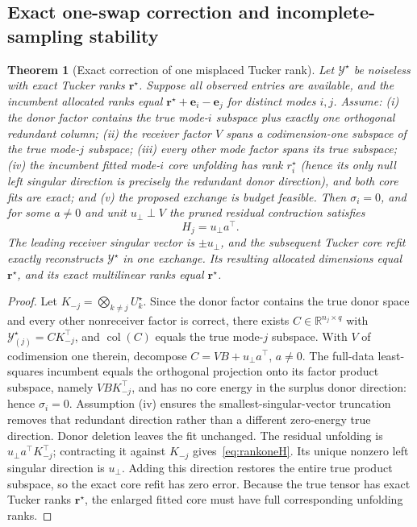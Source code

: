 \documentclass[review,10pt]{elsarticle}
\newtheorem{theorem}{Theorem}
\newcommand{\cY}{\mathcal Y}
\newcommand{\R}{\mathbb R}
\begin{document}
\subsection{Exact one-swap correction and incomplete-sampling stability}\label{subsec:oneswap}
\begin{theorem}[Exact correction of one misplaced Tucker rank]\label{thm:exactrecovery}
Let $\cY^\star$ be noiseless with exact Tucker ranks $\boldsymbol r^\star$. Suppose all observed entries are available, and the incumbent allocated ranks equal $\boldsymbol r^\star+\boldsymbol e_i-\boldsymbol e_j$ for distinct modes $i,j$. Assume: (i) the donor factor contains the true mode-$i$ subspace plus exactly one orthogonal redundant column; (ii) the receiver factor $V$ spans a codimension-one subspace of the true mode-$j$ subspace; (iii) every other mode factor spans its true subspace; (iv) the incumbent fitted mode-$i$ core unfolding has rank $r_i^\star$ (hence its only null left singular direction is precisely the redundant donor direction), and both core fits are exact; and (v) the proposed exchange is budget feasible. Then $\sigma_i=0$, and for some $a\ne0$ and unit $u_\perp\perp V$ the pruned residual contraction satisfies
\begin{equation}\label{eq:rankoneH}
H_j=u_\perp a^\top.
\end{equation}
The leading receiver singular vector is $\pm u_\perp$, and the subsequent Tucker core refit exactly reconstructs $\cY^\star$ in one exchange. Its resulting allocated dimensions equal $\boldsymbol r^\star$, and its exact multilinear ranks equal $\boldsymbol r^\star$.
\end{theorem}
\begin{proof}
Let $K_{-j}=\bigotimes_{k\ne j}U_k^\star$. Since the donor factor contains the true donor space and every other nonreceiver factor is correct, there exists $C\in\R^{n_j\times q}$ with $\cY^\star_{(j)}=C K_{-j}^\top$, and $\operatorname{col}(C)$ equals the true mode-$j$ subspace. With $V$ of codimension one therein, decompose $C=VB+u_\perp a^\top$, $a\ne0$. The full-data least-squares incumbent equals the orthogonal projection onto its factor product subspace, namely $VB K_{-j}^\top$, and has no core energy in the surplus donor direction: hence $\sigma_i=0$. Assumption (iv) ensures the smallest-singular-vector truncation removes that redundant direction rather than a different zero-energy true direction. Donor deletion leaves the fit unchanged. The residual unfolding is $u_\perp a^\top K_{-j}^\top$; contracting it against $K_{-j}$ gives~\eqref{eq:rankoneH}. Its unique nonzero left singular direction is $u_\perp$. Adding this direction restores the entire true product subspace, so the exact core refit has zero error. Because the true tensor has exact Tucker ranks $\boldsymbol r^\star$, the enlarged fitted core must have full corresponding unfolding ranks.\end{proof}
\end{document}
